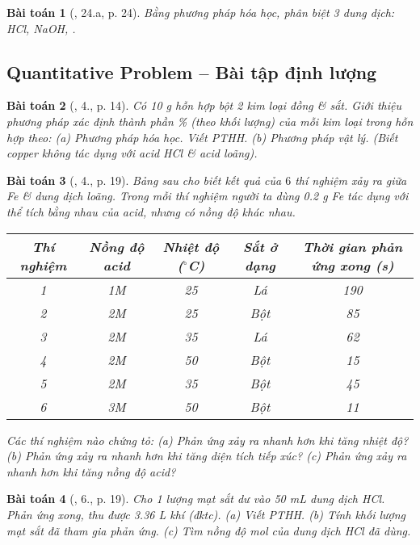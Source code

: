 \documentclass{article}
\newtheorem{baitoan}{Bài toán}
\begin{document}
\begin{baitoan}[\cite{An_350_BT_Hoa_Hoc_9}, 24.a, p. 24]
	Bằng phương pháp hóa học, phân biệt 3 dung dịch: \emph{HCl, NaOH, }.
\end{baitoan}

\subsection{Quantitative Problem -- Bài tập định lượng}

\begin{baitoan}[\cite{SGK_Hoa_Hoc_9}, 4., p. 14]
	Có \emph{10 g} hỗn hợp bột 2 kim loại đồng \& sắt. Giới thiệu phương pháp xác định thành phần \% (theo khối lượng) của mỗi kim loại trong hỗn hợp theo: (a) Phương pháp hóa học. Viết PTHH. (b) Phương pháp vật lý. (Biết copper không tác dụng với acid \emph{HCl} \& acid \emph{} loãng).
\end{baitoan}

\begin{baitoan}[\cite{SGK_Hoa_Hoc_9}, 4., p. 19]
	Bảng sau cho biết kết quả của $6$ thí nghiệm xảy ra giữa \emph{Fe} \& dung dịch \emph{} loãng. Trong mỗi thí nghiệm người ta dùng \emph{0.2 g Fe} tác dụng với thể tích bằng nhau của acid, nhưng có nồng độ khác nhau.
	\begin{table}[H]
		\centering
		\begin{tabular}{|c|c|c|c|c|}
			\hline
			Thí nghiệm & Nồng độ acid & Nhiệt độ (${}^\circ$C) & Sắt ở dạng & Thời gian phản ứng xong (s) \\
			\hline
			1 & 1M & 25 & Lá & 190 \\
			\hline
			2 & 2M & 25 & Bột & 85 \\
			\hline
			3 & 2M & 35 & Lá & 62 \\
			\hline
			4 & 2M & 50 & Bột & 15 \\
			\hline
			5 & 2M & 35 & Bột & 45 \\
			\hline
			6 & 3M & 50 & Bột & 11 \\
			\hline
		\end{tabular}
	\end{table}
	\noindent Các thí nghiệm nào chứng tỏ: (a) Phản ứng xảy ra nhanh hơn khi tăng nhiệt độ? (b) Phản ứng xảy ra nhanh hơn khi tăng diện tích tiếp xúc? (c) Phản ứng xảy ra nhanh hơn khi tăng nồng độ acid?
\end{baitoan}

\begin{baitoan}[\cite{SGK_Hoa_Hoc_9}, 6., p. 19]
	Cho 1 lượng mạt sắt dư vào \emph{50 mL} dung dịch \emph{HCl}. Phản ứng xong, thu được \emph{3.36 L} khí (đktc). (a) Viết PTHH. (b) Tính khối lượng mạt sắt đã tham gia phản ứng. (c) Tìm nồng độ mol của dung dịch \emph{HCl} đã dùng.
\end{baitoan}
\end{document}

